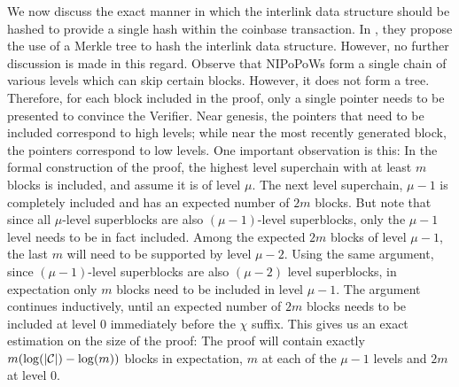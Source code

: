 We now discuss the exact manner in which the interlink data structure should be
hashed to provide a single hash within the coinbase transaction. In \cite{KLS},
they propose the use of a Merkle tree to hash the interlink data structure.
However, no further discussion is made in this regard. Observe that NIPoPoWs
form a single chain of various levels which can skip certain blocks. However,
it does not form a tree. Therefore, for each block included in the proof, only
a single pointer needs to be presented to convince the Verifier. Near genesis,
the pointers that need to be included correspond to high levels; while near the
most recently generated block, the pointers correspond to low levels. One
important observation is this: In the formal construction of the proof, the
highest level superchain with at least $m$ blocks is included, and assume it is
of level $\mu$. The next level superchain, $\mu - 1$ is completely included and
has an expected number of $2m$ blocks. But note that since all $\mu$-level
superblocks are also $(\mu - 1)$-level superblocks, only the $\mu - 1$ level
needs to be in fact included. Among the expected $2m$ blocks of level $\mu -
1$, the last $m$ will need to be supported by level $\mu - 2$. Using the same
argument, since $(\mu - 1)$-level superblocks are also $(\mu - 2)$ level
superblocks, in expectation only $m$ blocks need to be included in level $\mu
- 1$. The argument continues inductively, until an expected number of $2m$
blocks needs to be included at level $0$ immediately before the $\chi$ suffix.
This gives us an exact estimation on the size of the proof: The proof will
contain exactly $m (\log(|\mathcal{C}|) - \log(m))$ blocks in expectation, $m$ at each of
the $\mu - 1$ levels and $2m$ at level $0$.

